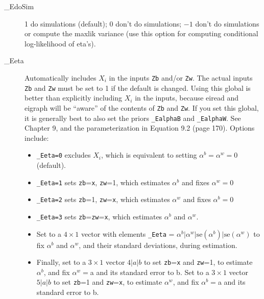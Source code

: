 \documentclass[11pt,titlepage]{article}
\begin{document}
\begin{description}
\item[\_EdoSim] 1 do simulations (default); 0 don't do simulations;
  $-1$ don't do simulations or compute the maxlik variance (use this
  option for computing conditional log-likelihood of eta's).

\item[\_Eeta] Automatically includes $X_i$ in the inputs \texttt{Zb}
  and/or \texttt{Zw}.  The actual inputs \texttt{Zb} and \texttt{Zw}
  must be set to 1 if the default is changed.  Using this global is
  better than explicitly including $X_i$ in the inputs, because eiread
  and eigraph will be ``aware'' of the contents of \texttt{Zb} and
  \texttt{Zw}.  If you set this global, it is generally best to also
  set the priors \texttt{\_EalphaB} and \texttt{\_EalphaW}.  See
  Chapter 9, and the parameterization in Equation 9.2 (page 170).
  Options include:
  \begin{itemize}
  \item \texttt{\_Eeta=0} excludes $X_i$, which is equivalent
    to setting $\alpha^b=\alpha^w=0$ (default).
  \item \texttt{\_Eeta=1} sets \texttt{zb}=\texttt{x}, \texttt{zw}=1,
    which estimates $\alpha^b$ and fixes $\alpha^w=0$
  \item \texttt{\_Eeta=2} sets \texttt{zb}=1, \texttt{zw}=\texttt{x},
    which estimates $\alpha^w$ and fixes $\alpha^b=0$
  \item \texttt{\_Eeta=3} sets \texttt{zb}=\texttt{zw}=\texttt{x},
    which estimates $\alpha^b$ and $\alpha^w$.
  \item Set to a $4\times 1$ vector with elements \texttt{\_Eeta} =
    $\alpha^b\vert\alpha^w\vert\text{se}(\alpha^b)\vert\text{se}(\alpha^w)$
    to fix $\alpha^b$ and $\alpha^w$, and their standard deviations,
    during estimation.
  \item Finally, set to a $3\times 1$ vector $4|a|b$ to set
    \texttt{zb}=\texttt{x} and \texttt{zw}=1, to estimate $\alpha^b$,
    and fix $\alpha^w=$a and its standard error to b. Set to a
    $3\times 1$ vector $5|a|b$ to set \texttt{zb}=1 and
    \texttt{zw}=\texttt{x}, to estimate $\alpha^w$, and fix
    $\alpha^b=$a and its standard error to b.
  \end{itemize}
  

\end{description}
\end{document}
